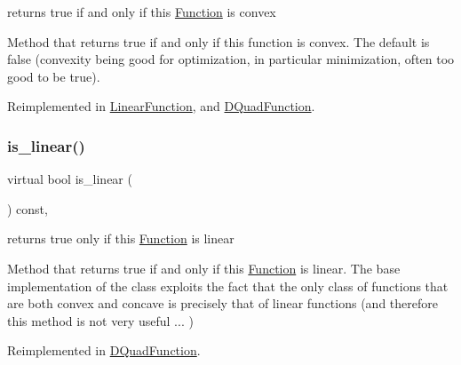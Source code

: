 returns true if and only if this \mbox{\hyperlink{class_s_m_spp__di__unipi__it_1_1_function}{Function}} is convex 

Method that returns true if and only if this function is convex. The default is false (convexity being good for optimization, in particular minimization, often too good to be true). 

Reimplemented in \mbox{\hyperlink{class_s_m_spp__di__unipi__it_1_1_linear_function_a13b81428d5637e56d77e2168ab66ea44}{Linear\+Function}}, and \mbox{\hyperlink{class_s_m_spp__di__unipi__it_1_1_d_quad_function_a20a6d803edcf5c8ae8b702b8a010af54}{D\+Quad\+Function}}.

\mbox{\label{class_s_m_spp__di__unipi__it_1_1_function_a76ad93a7b21d3deb7a917b3cd33d0a9d}} 
\subsubsection{\texorpdfstring{is\+\_\+linear()}{is\_linear()}}
{\footnotesize\ttfamily virtual bool is\+\_\+linear (\begin{DoxyParamCaption}\item[{void}]{ }\end{DoxyParamCaption}) const\hspace{0.3cm}{\ttfamily [inline]}, {\ttfamily [virtual]}}



returns true only if this \mbox{\hyperlink{class_s_m_spp__di__unipi__it_1_1_function}{Function}} is linear 

Method that returns true if and only if this \mbox{\hyperlink{class_s_m_spp__di__unipi__it_1_1_function}{Function}} is linear. The base implementation of the class exploits the fact that the only class of functions that are both convex and concave is precisely that of linear functions (and therefore this method is not very useful ... ) 

Reimplemented in \mbox{\hyperlink{class_s_m_spp__di__unipi__it_1_1_d_quad_function_a8afe6138b9ef7838ec5b851cbc3ad2fc}{D\+Quad\+Function}}.

\mbox{\label{class_s_m_spp__di__unipi__it_1_1_function_a72b5052e29d7f37c9798d9d6d33bd405}} 

